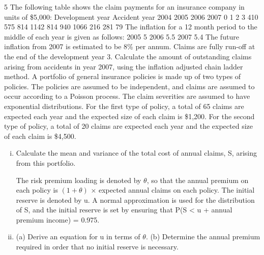 \documentclass[a4paper,12pt]{article}
\begin{document}
5
The following table shows the claim payments for an insurance company in units of
\$5,000:
Development year
Accident
year
2004
2005
2006
2007
0 1 2 3
410
575
814
1142 814
940
1066 216
281 79
The inflation for a 12 month period to the middle of each year is given as follows:
2005
5%
2006
5.5%
2007
5.4%
The future inflation from 2007 is estimated to be 8\% per annum.
Claims are fully run-off at the end of the development year 3.
Calculate the amount of outstanding claims arising from accidents in year 2007, using the inflation adjusted chain ladder method.
A portfolio of general insurance policies is made up of two types of policies. The policies are assumed to be independent, and claims are assumed to occur according to a Poisson process. The claim severities are assumed to have exponential distributions.
For the first type of policy, a total of 65 claims are expected each year and the expected size of each claim is \$1,200.
For the second type of policy, a total of 20 claims are expected each year and the expected size of each claim is \$4,500.
\begin{enumerate}[(i)]
\item Calculate the mean and variance of the total cost of annual claims, S, arising from this portfolio.

The risk premium loading is denoted by $\theta$, so that the annual premium on each policy is $(1+\theta)$ × expected annual claims on each policy. The initial reserve is denoted by u.
A normal approximation is used for the distribution of S, and the initial reserve is set by ensuring that
P(S < u + annual premium income) = 0.975.
\item
(a) Derive an equation for u in terms of $\theta$.
(b) Determine the annual premium required in order that no initial reserve
is necessary.
\end{enumerate}
\end{document}
